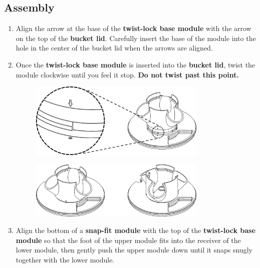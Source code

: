 \clearpage

\setlength{\intextsep}{15.0pt plus 0.0pt minus 0.0pt}
\setlength{\floatsep}{10.0pt plus 0.0pt minus 0.0pt}
\setlength{\textfloatsep}{15.0pt plus 0.0pt minus 0.0pt}
\setlength{\belowcaptionskip}{-30.0pt}

\subsection{Assembly}

\begin{enumerate}

\item Align the arrow at the base of the \textbf{twist-lock base module} with the arrow on the top of the \textbf{bucket lid}. Carefully insert the base of the module into the hole in the center of the bucket lid when the arrows are aligned.

\item Once the \textbf{twist-lock base module} is inserted into the \textbf{bucket lid}, twist the module clockwise until you feel it stop. \textbf{Do not twist past this point.}

\begin{figure}[h]
    \centering
    \includegraphics[width=0.8\textwidth]{images/50mm/50mm_assembly_1.png}
    \caption*{}
    \label{fig:50mm-one}
\end{figure}
\begin{figure}[h!]
    \centering
    \includegraphics[width=0.8\textwidth]{images/50mm/50mm_assembly_2.png}
    \caption*{}
    \label{fig:50mm-two}
\end{figure}

\item Align the bottom of a \textbf{snap-fit module} with the top of the \textbf{twist-lock base module} so that the foot of the upper module fits into the receiver of the lower module, then gently push the upper module down until it snaps snugly together with the lower module.


\end{enumerate}
